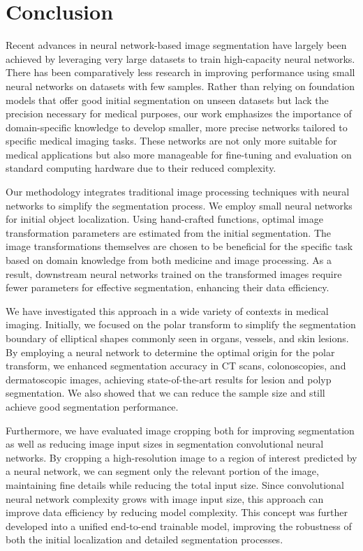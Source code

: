 \chapter{Conclusion}
\label{chap:conclusion}

Recent advances in neural network-based image segmentation have largely been achieved by leveraging very large datasets to train high-capacity neural networks. There has been comparatively less research in improving performance using small neural networks on datasets with few samples. Rather than relying on foundation models that offer good initial segmentation on unseen datasets but lack the precision necessary for medical purposes, our work emphasizes the importance of domain-specific knowledge to develop smaller, more precise networks tailored to specific medical imaging tasks. These networks are not only more suitable for medical applications but also more manageable for fine-tuning and evaluation on standard computing hardware due to their reduced complexity.

Our methodology integrates traditional image processing techniques with neural networks to simplify the segmentation process. We employ small neural networks for initial object localization. Using hand-crafted functions, optimal image transformation parameters are estimated from the initial segmentation. The image transformations themselves are chosen to be beneficial for the specific task based on domain knowledge from both medicine and image processing. As a result, downstream neural networks trained on the transformed images require fewer parameters for effective segmentation, enhancing their data efficiency.

We have investigated this approach in a wide variety of contexts in medical imaging. Initially, we focused on the polar transform to simplify the segmentation boundary of elliptical shapes commonly seen in organs, vessels, and skin lesions. By employing a neural network to determine the optimal origin for the polar transform, we enhanced segmentation accuracy in CT scans, colonoscopies, and dermatoscopic images, achieving state-of-the-art results for lesion and polyp segmentation. We also showed that we can reduce the sample size and still achieve good segmentation performance.

Furthermore, we have evaluated image cropping both for improving segmentation as well as reducing image input sizes in segmentation convolutional neural networks. By cropping a high-resolution image to a region of interest predicted by a neural network, we can segment only the relevant portion of the image, maintaining fine details while reducing the total input size. Since convolutional neural network complexity grows with image input size, this approach can improve data efficiency by reducing model complexity. This concept was further developed into a unified end-to-end trainable model, improving the robustness of both the initial localization and detailed segmentation processes.

